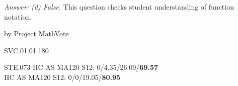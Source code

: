 {\it Answer:  (d) False.}  This question checks student understanding of function notation.

\medskip
by Project MathVote

SVC.01.01.180

STE.073
HC AS MA120 S12: 0/4.35/26.09/{\bf69.57}  \\
HC AS MA120 S12: 0/0/19.05/{\bf80.95}  \\
